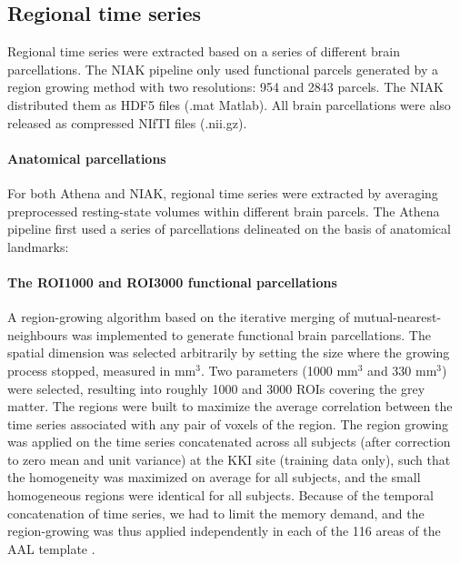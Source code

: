 \documentclass[preprint,12pt,3p]{elsarticle}
\begin{document}
\subsection{Regional time series} Regional time series were extracted based on a series of different brain parcellations. The NIAK pipeline only used functional parcels generated by a region growing method \cite{bellec2006identification} with two resolutions: 954 and 2843 parcels. The  NIAK distributed them as HDF5 files (.mat Matlab). All brain parcellations were also released as compressed NIfTI files (.nii.gz). 
\paragraph{Anatomical parcellations} For both Athena and NIAK, regional time series were extracted by averaging preprocessed resting-state volumes within different brain parcels. The Athena pipeline first used a series of parcellations delineated on the basis of anatomical landmarks:

\paragraph{The ROI1000 and ROI3000 functional parcellations} A region-growing algorithm \citep{bellec2006identification} based on the iterative merging of mutual-nearest-neighbours was implemented to generate functional brain parcellations. The spatial dimension was selected arbitrarily by setting the size where the growing process stopped, measured in mm$^3$. Two parameters (1000 mm$^3$ and 330 mm$^3$) were selected, resulting into roughly 1000 and 3000 ROIs covering the grey matter. The regions were built to maximize the average correlation between the time series associated with any pair of voxels of the region. The region growing was applied on the time series concatenated across all subjects (after correction to zero mean and unit variance) at the KKI site (training data only), such that the homogeneity was maximized on average for all subjects, and the small homogeneous regions were identical for all subjects. Because of the temporal concatenation of time series, we had to limit the memory demand, and the region-growing was thus applied independently in each of the 116 areas of the AAL template \citep{tzourio2002automated}. 




\end{document}
